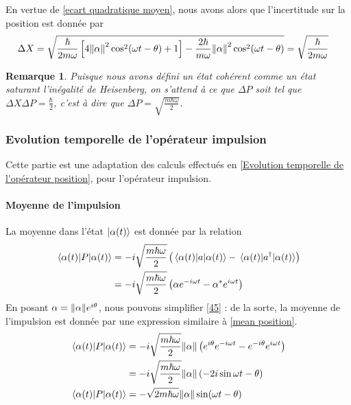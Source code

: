 \documentclass[11pt,oneside,a4paper]{article}
\newcommand{\h}{\ensuremath{\hbar}}
\newtheorem{remark}[theorem]{Remarque}
\begin{document}
En vertue de \eqref{ecart quadratique moyen}, nous avons alors que l'incertitude sur la position est donnée par
\begin{align}
  \Delta X &= \sqrt{\frac{\h}{2m\omega}\left[4\norm{\alpha}^2\cos^2(\omega t-\theta)+1\right] - \frac{2\h}{m\omega}\norm{\alpha}^2\cos^2(\omega t-\theta)} = \sqrt{\frac{\h}{2m\omega}}
\end{align}

\begin{remark}
  Puisque nous avons défini un état cohérent comme un état saturant l'inégalité de Heisenberg, on s'attend à ce que $\Delta P$ soit tel que $\Delta X\Delta P = \frac{\h}{2}$, c'est à dire que $\Delta P = \sqrt{\frac{m\h\omega}{2}}$.
\end{remark}

\subsubsection{Evolution temporelle de l'opérateur impulsion}
\label{Evolution temporelle de l'opérateur impulsion}

Cette partie est une adaptation des calculs effectués en \ref{Evolution temporelle de l'opérateur position}, pour l'opérateur impulsion.

\paragraph{Moyenne de l'impulsion}

La moyenne dans l'état $\ket{\alpha(t)}$ est donnée par la relation
\begin{align}
  \expval{P}{\alpha(t)} &= -i\sqrt{\frac{m\h\omega}{2}}\left(\expval{a}{\alpha(t)}-\expval{a^\dagger}{\alpha(t)}\right)\\
  &= -i\sqrt{\frac{m\h\omega}{2}}\left(\alpha e^{-i\omega t}-\alpha^*e^{i\omega t}\right)\label{45}
\end{align}
En posant $\alpha = \norm{\alpha}e^{i\theta}$, nous pouvons simplifier \eqref{45} : de la sorte, la moyenne de l'impulsion est donnée par une expression similaire à \eqref{mean position}.
\begin{align}
  \expval{P}{\alpha(t)} &= -i\sqrt{\frac{m\h\omega}{2}}\norm{\alpha}\left(e^{i\theta}e^{-i\omega t}-e^{-i\theta}e^{i\omega t}\right)\\
  &= -i\sqrt{\frac{m\h\omega}{2}}\norm{\alpha} \left(-2i\sin\omega t-\theta\right)\\
  \expval{P}{\alpha(t)} &= -\sqrt{2m\h\omega}\norm{\alpha}\sin(\omega t-\theta)
\end{align} 
\end{document}
